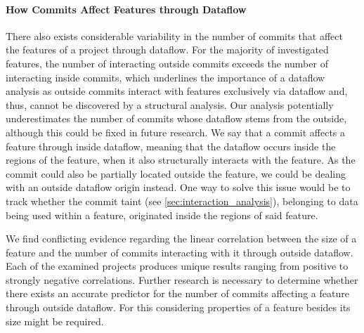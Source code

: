 \paragraph{How Commits Affect Features through Dataflow}
There also exists considerable variability in the number of commits that affect the features of a project through dataflow.
For the majority of investigated features, the number of interacting outside commits exceeds the number of interacting inside commits, which underlines the importance of a dataflow analysis as outside commits interact with features exclusively via dataflow and, thus, cannot be discovered by a structural analysis.
Our analysis potentially underestimates the number of commits whose dataflow stems from the outside, although this could be fixed in future research.
We say that a commit affects a feature through inside dataflow, meaning that the dataflow occurs inside the regions of the feature, when it also structurally interacts with the feature.
As the commit could also be partially located outside the feature, we could be dealing with an outside dataflow origin instead.
One way to solve this issue would be to track whether the commit taint (see \autoref{sec:interaction_analysis}), belonging to data being used within a feature, originated inside the regions of said feature. 

We find conflicting evidence regarding the linear correlation between the size of a feature and the number of commits interacting with it through outside dataflow.
Each of the examined projects produces unique results ranging from positive to strongly negative correlations.
Further research is necessary to determine whether there exists an accurate predictor for the number of commits affecting a feature through outside dataflow.
For this considering properties of a feature besides its size might be required.

